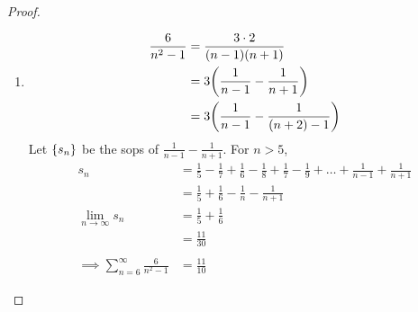 \documentclass[12pt]{article}
\begin{document}
\begin{proof}
\begin{enumerate}[label=(\alph*)]
        \item
        \begin{align*}
            \frac{6}{n^{2} - 1} &= \frac{3 \cdot 2}{(n - 1)(n + 1)} \\
            &= 3 \paren{\frac{1}{n - 1} - \frac{1}{n + 1}} \\
            &= 3 \paren{\frac{1}{n - 1} - \frac{1}{(n + 2) - 1}} \\
        \end{align*}
        Let $\set{s_{n}}$ be the sops of $\frac{1}{n-1} - \frac{1}{n+1}$. For $n > 5$,
        \begin{align*}
            s_{n} &= \frac{1}{5} - \frac{1}{7} + \frac{1}{6} - \frac{1}{8} + \frac{1}{7} - \frac{1}{9} + \dots + \frac{1}{n-1} + \frac{1}{n + 1} \\
            &= \frac{1}{5} + \frac{1}{6} - \frac{1}{n} - \frac{1}{n+1} \\
            \lim_{n \to \infty} s_{n} &= \frac{1}{5} + \frac{1}{6} \\
            &= \frac{11}{30} \\
            \\
            \implies \sum_{n=6}^{\infty} \frac{6}{n^{2} - 1} &= \frac{11}{10}
        \end{align*}


\end{enumerate}
\end{proof}
\end{document}
